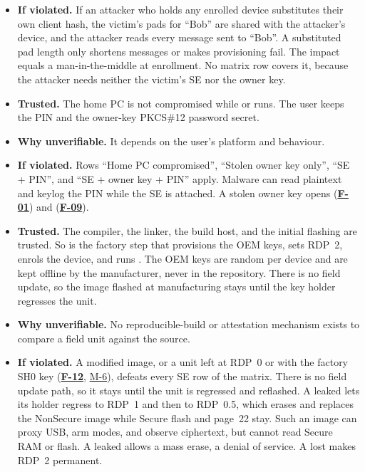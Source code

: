 \documentclass[11pt,a4paper]{article}
\newcommand{\fid}[1]{\textbf{#1}}
\begin{document}
\begin{description}[style=nextline,leftmargin=1.2em]
\begin{itemize}
\item \textbf{If violated.} If an attacker who holds any enrolled device substitutes their own client hash, the victim's pads for ``Bob'' are shared with the attacker's device, and the attacker reads every message sent to ``Bob''. A substituted pad length only shortens messages or makes provisioning fail. The impact equals a man-in-the-middle at enrollment. No matrix row covers it, because the attacker needs neither the victim's SE nor the owner key.
\end{itemize}
\item[TA-8 Home PC and user]\label{ta:TA-8}
\begin{itemize}
\item \textbf{Trusted.} The home PC is not compromised while  or  runs. The user keeps the PIN and the owner-key PKCS\#12 password secret.
\item \textbf{Why unverifiable.} It depends on the user's platform and behaviour.
\item \textbf{If violated.} Rows ``Home PC compromised'', ``Stolen owner key only'', ``SE + PIN'', and ``SE + owner key + PIN'' apply. Malware can read plaintext and keylog the PIN while the SE is attached. A stolen owner key opens  (\hyperref[f:F-01]{\fid{F-01}}) and  (\hyperref[f:F-09]{\fid{F-09}}).
\end{itemize}
\item[TA-9 Toolchain and manufacturing]\label{ta:TA-9}
\begin{itemize}
\item \textbf{Trusted.} The compiler, the linker, the build host, and the initial flashing are trusted. So is the factory step that provisions the OEM keys, sets RDP~2, enrols the device, and runs . The OEM keys are random per device and are kept offline by the manufacturer, never in the repository. There is no field update, so the image flashed at manufacturing stays until the key holder regresses the unit.
\item \textbf{Why unverifiable.} No reproducible-build or attestation mechanism exists to compare a field unit against the source.
\item \textbf{If violated.} A modified image, or a unit left at RDP~0 or with the factory SH0 key (\hyperref[f:F-12]{\fid{F-12}}, \hyperref[m:M-6]{M-6}), defeats every SE row of the matrix. There is no field update path, so it stays until the unit is regressed and reflashed. A leaked  lets its holder regress to RDP~1 and then to RDP~0.5, which erases and replaces the NonSecure image while Secure flash and page~22 stay. Such an image can proxy USB, arm modes, and observe ciphertext, but cannot read Secure RAM or flash. A leaked  allows a mass erase, a denial of service. A lost  makes RDP~2 permanent.
\end{itemize}
\end{description}
\end{document}
